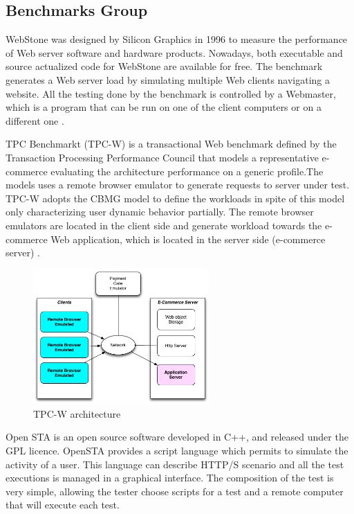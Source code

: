 \documentclass[espaco=umemeio,chapter=TITLE,twoside,openright]{abnt}
\begin{document}
\subsection{Benchmarks Group}

WebStone was designed by Silicon Graphics in 1996 to measure the performance of Web server software and hardware products. Nowadays, both executable and source actualized code for WebStone are available for free. The benchmark generates a Web server load by simulating multiple Web clients navigating a website. All the testing done by the benchmark is controlled by a Webmaster, which is a program that can be run on one of the client computers or on a different one \cite{MohammadS.Obaidat} \cite{Trent1995} .

TPC Benchmarkt (TPC-W) is a transactional Web benchmark defined by the Transaction Processing Performance Council that models a representative e-commerce evaluating the architecture performance on a generic profile.The models uses a remote browser emulator to generate requests to server under test. TPC-W adopts the CBMG model to define the workloads in spite of this model only characterizing user dynamic behavior partially. The remote browser emulators are located in the client side and generate workload towards the e-commerce Web application, which is located in the server side (e-commerce server) \cite{MohammadS.Obaidat} \cite{Menasce2002a}.

\begin{figure}[h]
\centering
\includegraphics[width=0.6\textwidth]{./images/tpcw.png}
\caption{TPC-W architecture \cite{MohammadS.Obaidat} \cite{Menasce2002a}}
\label{fig:tpcw}
\end{figure}


Open STA is an open source software developed in C++, and released under the GPL licence. OpenSTA provides a script language which permits to simulate the activity of a user. This language can describe HTTP/S scenario and all the test executions is managed in a graphical interface. The composition of the test is
very simple, allowing the tester choose scripts for a test and a remote computer that will execute each test.
\end{document}
